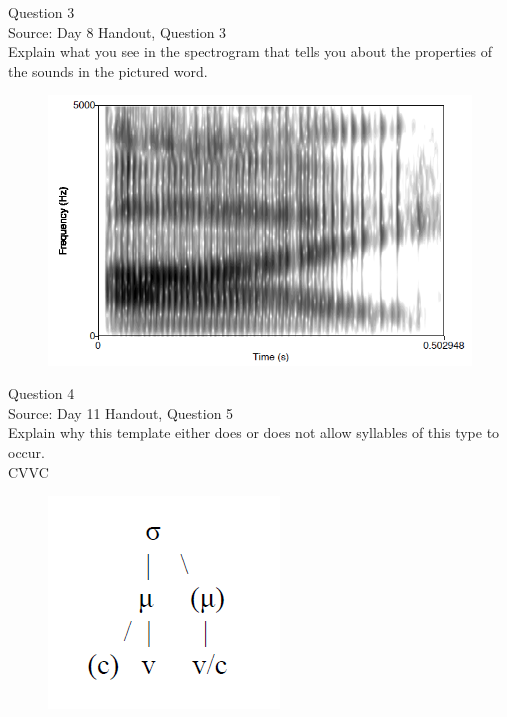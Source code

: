 \documentclass[12pt]{article}
\begin{document}
\newpage

{\large Question 3}\\

Source: Day 8 Handout, Question 3\\

Explain what you see in the spectrogram that tells you about the properties of the sounds in the pictured word.\\

\begin{figure}[H]
\includegraphics{../images/spectrogram_I.png}
\end{figure}

\newpage

{\large Question 4}\\

Source: Day 11 Handout, Question 5\\

Explain why this template either does or does not allow syllables of this type to occur.\\

CVVC

\begin{figure}[H]
\includegraphics{../images/ponapean_syllabletemplate.png}
\end{figure}
\end{document}
